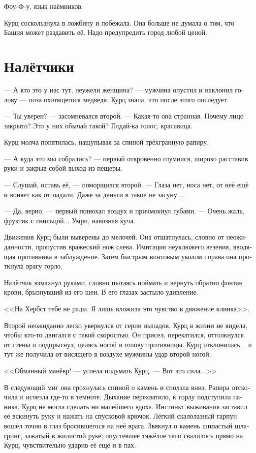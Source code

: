 \documentclass[a4paper,12pt,fleqn]{book}\usepackage{cooltooltips}\usepackage{polyglossia}\setdefaultlanguage[babelshorthands=true]{russian}\setotherlanguage{english}\defaultfontfeatures{Ligatures=TeX,Mapping=tex-text} \usepackage{xcolor}\definecolor{lightgray}{HTML}{bbbbbb}\color{lightgray}\newcommand{\ml}[3]{\textenglish{\textcolor{black}{#3}}}
\begin{document}
Фоу-Ф-у, язык наёмников.

Курц соскользнула в ложбину и побежала.
Она больше не думала о том, что Башня может раздавить её.
Надо предупредить город любой ценой.

\section{Налётчики}

--- А кто это у нас тут, неужели женщина? --- мужчина опустил и наклонил голову --- поза охотящегося медведя.
Курц знала, что после этого последует.

--- Ты уверен? --- засомневался второй.
--- Какая-то она странная.
Почему лицо закрыто?
Это у них обычай такой?
Подай-ка голос, красавица.

Курц молча попятилась, нащупывая за спиной трёхгранную рапиру.

--- А куда это мы собрались? --- первый откровенно глумился, широко расставив руки и закрыв собой выход из пещеры.

--- Слушай, оставь её, --- поморщился второй.
--- Глаза нет, носа нет, от неё ещё и воняет как от падали.
Даже за деньги в такое не засуну...

--- Да, верно, --- первый понюхал воздух и причмокнул губами.
--- Очень жаль, фруктик с гнильцой...
Умри, навозная куча.

Движения Курц были выверены до мелочей.
Она отшатнулась, словно от неожиданности, пропустив вражеский нож слева.
Имитация неуклюжего везения, вводящая противника в заблуждение.
Затем быстрым винтовым уколом справа она проткнула врагу горло.

Налётчик взмахнул руками, словно пытаясь поймать и вернуть обратно фонтан крови, брызнувший из его шеи.
В его глазах застыло удивление.

<<На Хербст тебе не рады.
Я лишь вложила это чувство в движение клинка>>.

Второй неожиданно легко увернулся от серии выпадов.
Курц в жизни не видела, чтобы кто-то двигался с такой скоростью.
Он присел, перекатился, оттолкнулся от стены и подпрыгнул, целясь ногой в голову противницы.
Курц отклонилась... и тут же получила от висящего в воздухе мужчины удар второй ногой.

<<Обманный манёвр! --- успела подумать Курц.
--- Вот это сила...>>

В следующий миг она грохнулась спиной о камень и сползла вниз.
Рапира отскочила и исчезла где-то в темноте.
Дыхание перехватило, к горлу подступила паника, Курц не могла сделать ни малейшего вдоха.
Инстинкт выживания заставил её вскинуть руку и нажать на спусковой крючок.
Лёгкий скалолазный гарпун вошёл точно в глаз бросившегося на неё врага.
Звякнул о камень шипастый шлагринг, зажатый в жилистой руке;
опустевшее тяжёлое тело свалилось прямо на Курц, чувствительно ударив её ещё и в пах.
\end{document}
